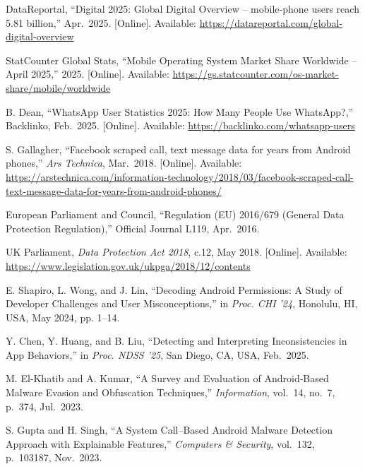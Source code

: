 \documentclass[a4paper,12pt]{report}
\begin{document}
\begin{thebibliography}{99}
DataReportal, “Digital 2025: Global Digital Overview – mobile‐phone users reach 5.81 billion,” Apr.\ 2025.  [Online]. Available: \url{https://datareportal.com/global-digital-overview}

StatCounter Global Stats, “Mobile Operating System Market Share Worldwide – April 2025,” 2025. [Online]. Available: \url{https://gs.statcounter.com/os-market-share/mobile/worldwide}

B. Dean, “WhatsApp User Statistics 2025: How Many People Use WhatsApp?,” Backlinko, Feb.\ 2025.  [Online]. Available: \url{https://backlinko.com/whatsapp-users}

S. Gallagher, “Facebook scraped call, text message data for years from Android phones,” \emph{Ars Technica}, Mar.\ 2018.  [Online]. Available: \url{https://arstechnica.com/information-technology/2018/03/facebook-scraped-call-text-message-data-for-years-from-android-phones/}

European Parliament and Council, “Regulation (EU) 2016/679 (General Data Protection Regulation),” Official Journal L119, Apr.\ 2016.

UK Parliament, \emph{Data Protection Act 2018}, c.12, May 2018.  [Online]. Available: \url{https://www.legislation.gov.uk/ukpga/2018/12/contents}

E. Shapiro, L. Wong, and J. Lin, “Decoding Android Permissions: A Study of Developer Challenges and User Misconceptions,” in \emph{Proc. CHI ’24}, Honolulu, HI, USA, May 2024, pp. 1–14.

Y. Chen, Y. Huang, and B. Liu, “Detecting and Interpreting Inconsistencies in App Behaviors,” in \emph{Proc. NDSS ’25}, San Diego, CA, USA, Feb.\ 2025.

M. El‐Khatib and A. Kumar, “A Survey and Evaluation of Android‐Based Malware Evasion and Obfuscation Techniques,” \emph{Information}, vol.\ 14, no.\ 7, p.~374, Jul.\ 2023.

S. Gupta and H. Singh, “A System Call–Based Android Malware Detection Approach with Explainable Features,” \emph{Computers \& Security}, vol.\ 132, p.~103187, Nov.\ 2023.


\end{thebibliography}
\end{document}
